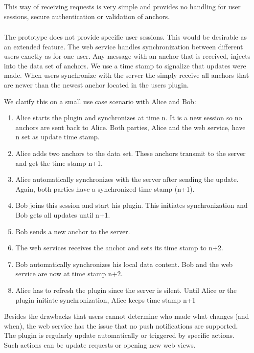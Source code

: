 This way of receiving requests is very simple and provides no handling for user sessions, secure authentication or validation of anchors.

\subsubsection[User Session Synchronization]{\reqWSii}

The prototype does not provide specific user sessions. This would be desirable as an extended feature. The web service handles synchronization between different users exactly as for one user. 
Any message with an anchor that is received, injects into the data set of anchors. We use a time stamp to signalize that updates were made. When users synchronize with the server the simply receive all anchors that are newer than the newest anchor located in the users plugin. 

We clarify this on a small use case scenario with Alice and Bob:
\begin{enumerate}
\item Alice starts the plugin and synchronizes at time n. It is a new session so no anchors are sent back to Alice. Both parties, Alice and the web service, have n set as update time stamp.
\item Alice adds two anchors to the data set. These anchors transmit to the server and get the time stamp n+1.
\item Alice automatically synchronizes with the server after sending the update. Again, both parties have a synchronized time stamp (n+1).
\item Bob joins this session and start his plugin. This initiates synchronization and Bob gets all updates until n+1.
\item Bob sends a new anchor to the server. 
\item The web services receives the anchor and sets its time stamp to n+2. 
\item Bob automatically synchronizes his local data content. Bob and the web service are now at time stamp n+2. 
\item Alice has to refresh the plugin since the server is silent. Until Alice or the plugin initiate synchronization, Alice keeps time stamp n+1
\end{enumerate}

Besides the drawbacks that users cannot determine who made what changes (and when), the web service has the issue that no push notifications are supported. The plugin is regularly update automatically or triggered by specific actions. Such actions can be update requests or opening new web views. 

